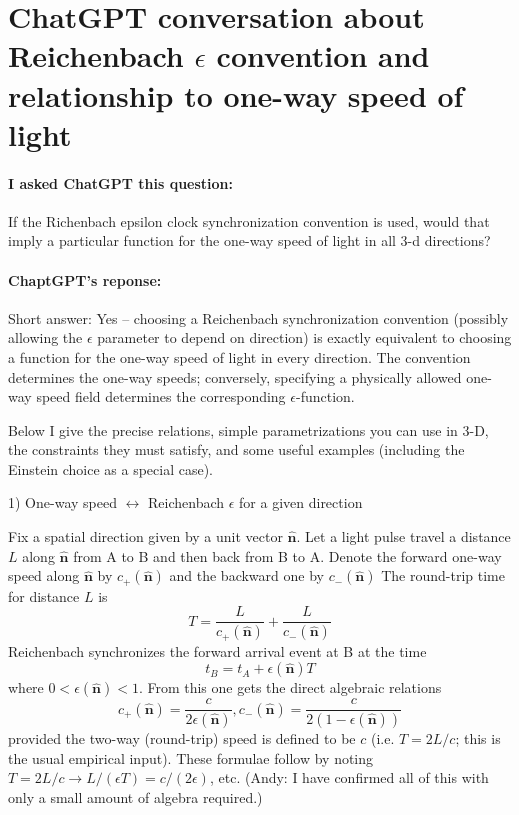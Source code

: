 \documentclass[a4paper]{article}
\theoremstyle{plain}
\theoremstyle{definition}
\newcommand{\hatvec}[1]{\hat{\mathbf{#1}}}
\begin{document}
\section{ChatGPT conversation about Reichenbach $\epsilon$ convention and relationship to one-way speed of light}
\label{app:reichenback-epsilon}


\paragraph{I asked ChatGPT this question:}

If the Richenbach epsilon clock synchronization convention is used,
would that imply a particular function for the one-way speed of light
in all 3-d directions?


\paragraph{ChaptGPT's reponse:}

Short answer: Yes -- choosing a Reichenbach synchronization convention
(possibly allowing the $\epsilon$ parameter to depend on direction) is
exactly equivalent to choosing a function for the one-way speed of
light in every direction.  The convention determines the one-way
speeds; conversely, specifying a physically allowed one-way speed
field determines the corresponding $\epsilon$-function.

Below I give the precise relations, simple parametrizations you can
use in 3-D, the constraints they must satisfy, and some useful
examples (including the Einstein choice as a special case).

1) One-way speed $\leftrightarrow$ Reichenbach $\epsilon$ for a given direction

Fix a spatial direction given by a unit vector $\hatvec{n}$.
Let a light pulse travel a distance $L$
along $\hatvec{n}$
from A to B and then back from B to A.
Denote the forward one-way speed along $\hatvec{n}$ by
$c_{+}(\hatvec{n})$
and the backward one by 
$c_{-}(\hatvec{n})$
The round-trip time for distance $L$ is
\begin{equation}
T = \frac{L}{c_{+}(\hatvec{n})} + \frac{L}{c_{-}(\hatvec{n})}
\end{equation}
Reichenbach synchronizes the forward arrival event at B at the time
\begin{equation}
t_B = t_A + \epsilon(\hatvec{n}) T
\end{equation}
where $0 < \epsilon(\hatvec{n}) < 1$.
From this one gets the direct algebraic relations
\begin{equation}
c_{+}(\hatvec{n}) = \frac{c}{2 \epsilon(\hatvec{n})}, c_{-}(\hatvec{n}) = \frac{c}{2(1-\epsilon(\hatvec{n}))}
\end{equation}
provided the two-way (round-trip) speed is defined to be $c$
(i.e. $T = 2L/c$; this is the usual empirical input).
These formulae follow by noting $T = 2L/c \rightarrow L/(\epsilon T) =
c/(2 \epsilon)$, etc.  (Andy: I have confirmed all of this with
only a small amount of algebra required.)
\end{document}
